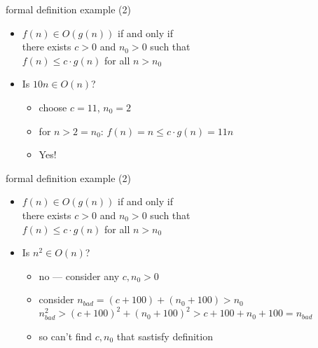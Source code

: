 \begin{frame}{formal definition example (2)}
    \begin{itemize}
    \item $f(n) \in O(g(n))$ if and only if \\
        \hspace{.5cm}there exists $c > 0$ and $n_0 > 0$ such that \\
        \hspace{.5cm}$f(n) \le c \cdot g(n)$ for all $n > n_0$
    \item Is $10n \in O(n)$?
        \begin{itemize}
        \item<2-> choose $c = 11$, $n_0 = 2$
        \item<2-> for $n > 2=n_0$: $f(n) = n \le c\cdot g(n) = 11n$
        \item<2-> Yes!
        \end{itemize}
    \end{itemize}
\end{frame}
\begin{frame}{formal definition example (2)}
    \begin{itemize}
    \item $f(n) \in O(g(n))$ if and only if \\
        \hspace{.5cm}there exists $c > 0$ and $n_0 > 0$ such that \\
        \hspace{.5cm}$f(n) \le c \cdot g(n)$ for all $n > n_0$
    \item Is $n^2 \in O(n)$?
        \begin{itemize}
        \item<2-> no --- consider any $c, n_0 > 0$
        \item<2-> consider $n_{bad} = (c + 100) + (n_0 + 100) > n_0$ \\
            $n_{bad}^2 > (c + 100)^2 + (n_0 + 100)^2 > c + 100 + n_0 + 100 = n_{bad}$ \\
        \item<2-> so can't find $c, n_0$ that sastisfy definition
        \end{itemize}
    \end{itemize}
\end{frame}

